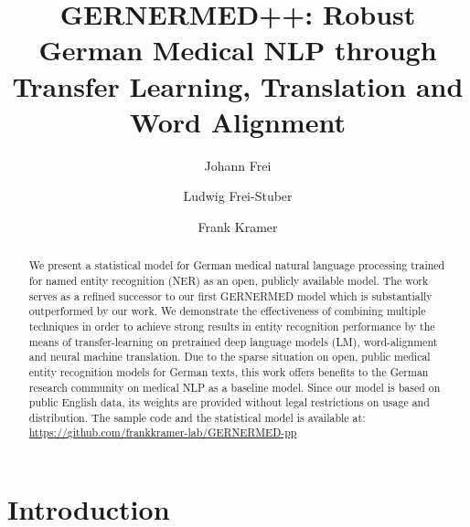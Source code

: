 \documentclass[runningheads]{llncs}
\begin{document}
%
\title{GERNERMED++: Robust German Medical NLP through Transfer Learning, Translation and Word Alignment}

\author{Johann Frei \and
Ludwig Frei-Stuber \and
Frank Kramer
}



\maketitle

\begin{abstract}
We present a statistical model for German medical natural language processing trained for named entity recognition (NER) as an open, publicly available model. The work serves as a refined successor to our first GERNERMED model which is substantially outperformed by our work. We demonstrate the effectiveness of combining multiple techniques in order to achieve strong results in entity recognition performance by the means of transfer-learning on pretrained deep language models (LM), word-alignment and neural machine translation. Due to the sparse situation on open, public medical entity recognition models for German texts, this work offers benefits to the German research community on medical NLP as a baseline model.
Since our model is based on public English data, its weights are provided without legal restrictions on usage and distribution.
The sample code and the statistical model is available at:\\\url{https://github.com/frankkramer-lab/GERNERMED-pp}

\end{abstract}

\section{Introduction}
\end{document}

